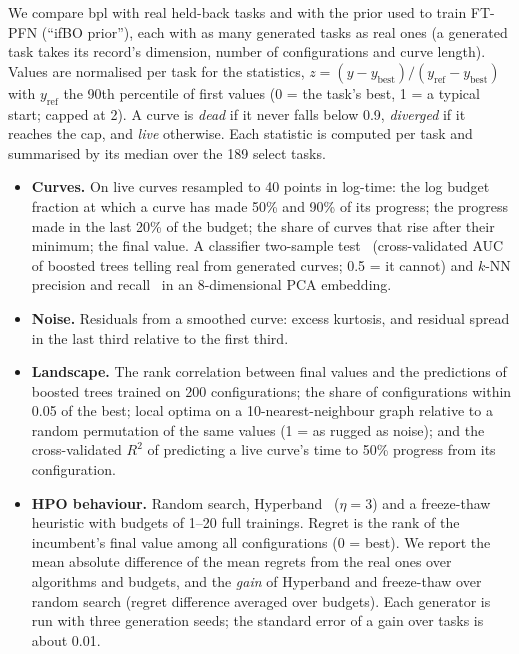 \documentclass[10pt]{article}
\newcommand{\bpl}{\textsf{bpl}}
\begin{document}
We compare \bpl{} with real held-back tasks and with the prior used to train FT-PFN (``ifBO prior''), each with as
many generated tasks as real ones (a generated task takes its record's dimension, number of configurations and curve
length). Values are normalised per task for the statistics, $z = (y - y_\text{best}) /
(y_\text{ref} - y_\text{best})$ with $y_\text{ref}$ the 90th percentile of first values (0 = the task's best, 1 = a
typical start; capped at 2). A curve is \emph{dead} if it never falls below 0.9, \emph{diverged} if it reaches the
cap, and \emph{live} otherwise. Each statistic is computed per task and summarised by its median over the 189 select
tasks.
\begin{itemize}
  \item \textbf{Curves.} On live curves resampled to 40 points in log-time: the log budget fraction at which a curve
    has made 50\% and 90\% of its progress; the progress made in the last 20\% of the budget; the share of curves
    that rise after their minimum; the final value. A classifier two-sample test~\cite{lopezpaz2017revisiting}
    (cross-validated AUC of boosted trees telling real from generated curves; 0.5 = it cannot) and $k$-NN precision
    and recall~\cite{kynkaanniemi2019improved} in an 8-dimensional PCA embedding.
  \item \textbf{Noise.} Residuals from a smoothed curve: excess kurtosis, and residual spread in the last third
    relative to the first third.
  \item \textbf{Landscape.} The rank correlation between final values and the predictions of boosted trees trained
    on 200 configurations; the share of configurations within 0.05 of the best; local optima on a
    10-nearest-neighbour graph relative to a random permutation of the same values (1 = as rugged as noise); and the
    cross-validated $R^2$ of predicting a live curve's time to 50\% progress from its configuration.
  \item \textbf{HPO behaviour.} Random search, Hyperband~\cite{li2018hyperband} ($\eta = 3$) and a freeze-thaw
    heuristic with budgets of 1--20 full trainings. Regret is the rank of the incumbent's final value among all
    configurations (0 = best). We report the mean absolute difference of the mean regrets from the real ones over
    algorithms and budgets, and the \emph{gain} of Hyperband and freeze-thaw over random search (regret difference
    averaged over budgets). Each generator is run with three generation seeds; the standard error of a gain over
    tasks is about 0.01.
\end{itemize}
\end{document}
